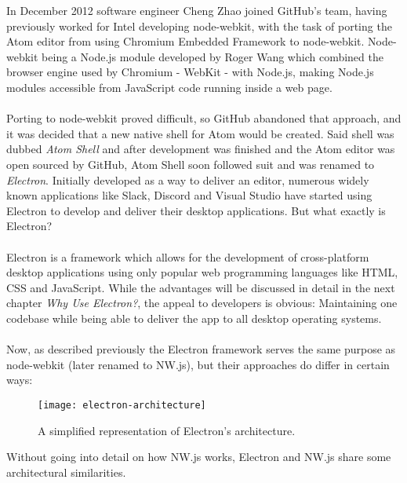 In December 2012 software engineer Cheng Zhao joined GitHub's team, having previously worked for Intel developing
node-webkit, with the task of porting the Atom editor from using Chromium Embedded Framework to node-webkit.
Node-webkit being a Node.js module developed by Roger Wang which combined the browser engine used by Chromium - WebKit - 
with Node.js, making Node.js modules accessible from JavaScript code running inside a web page. \parencite{jensen2017}\paragraph{}

Porting to node-webkit proved difficult, so GitHub abandoned that approach, and it was decided that a new native shell
for Atom would be created.
Said shell was dubbed \emph{Atom Shell} and after development was finished and the Atom editor was open sourced
by GitHub, Atom Shell soon followed suit and was renamed to \emph{Electron}.
Initially developed as a way to deliver an editor, numerous widely known applications like Slack, Discord and Visual
Studio have started using Electron to develop and deliver their desktop applications.\parencite{electronDocs}
But what exactly is Electron?\paragraph{}
Electron is a framework which allows for the development of cross-platform desktop applications using only popular 
web programming languages like HTML, CSS and JavaScript. 
While the advantages will be discussed in detail in the next chapter \emph{Why Use Electron?}, the appeal to developers
is obvious: Maintaining one codebase while being able to deliver the app to all desktop operating systems.\paragraph{}
Now, as described previously the Electron framework serves the same purpose as node-webkit (later renamed to NW.js), but
their approaches do differ in certain ways: \parencite{jensen2017}\par
\begin{figure}[ht]
    \label{fig:el-architecture}
    \caption{A simplified representation of Electron's architecture. \parencite{jensen2017}}
    \texttt{[image: electron-architecture]}
\end{figure}
Without going into detail on how NW.js works, Electron and NW.js share some architectural similarities.
